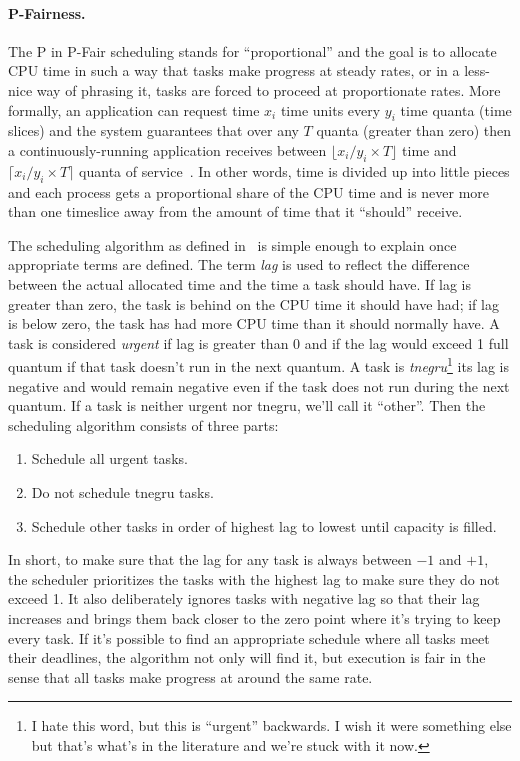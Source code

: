 \paragraph{P-Fairness.}
The P in P-Fair scheduling stands for ``proportional'' and the goal is to allocate CPU time in such a way that tasks make progress at steady rates, or in a less-nice way of phrasing it, tasks are forced to proceed at proportionate rates. More formally, an application can request time $x_i$ time units every $y_i$ time quanta (time slices) and the system guarantees that over any $T$ quanta (greater than zero) then a continuously-running application receives between $\lfloor x_i/y_i \times T\rfloor$ time and $\lceil x_i/y_i \times T\rceil$ quanta of service~\cite{pfair2}. In other words, time is divided up into little pieces and each process gets a proportional share of the CPU time and is never more than one timeslice away from the amount of time that it ``should'' receive.

The scheduling algorithm as defined in~\cite{pfair} is simple enough to explain once appropriate terms are defined. The term \textit{lag} is used to reflect the difference between the actual allocated time and the time a task should have. If lag is greater than zero, the task is behind on the CPU time it should have had; if lag is below zero, the task has had more CPU time than it should normally have.  A task is considered \textit{urgent} if lag is greater than 0 and if the lag would exceed 1 full quantum if that task doesn't run in the next quantum. A task is \textit{tnegru}\footnote{I hate this word, but this is ``urgent'' backwards. I wish it were something else but that's what's in the literature and we're stuck with it now.} its lag is negative and would remain negative even if the task does not run during the next quantum. If a task is neither urgent nor tnegru, we'll call it ``other''. Then the scheduling algorithm consists of three parts:
\begin{enumerate}
	\item Schedule all urgent tasks.
	\item Do not schedule tnegru tasks.
	\item Schedule other tasks in order of highest lag to lowest until capacity is filled.
\end{enumerate}

In short, to make sure that the lag for any task is always between $-1$ and $+1$, the scheduler prioritizes the tasks with the highest lag to make sure they do not exceed 1. It also deliberately ignores tasks with negative lag so that their lag increases and brings them back closer to the zero point where it's trying to keep every task. If it's possible to find an appropriate schedule where all tasks meet their deadlines, the algorithm not only will find it, but execution is fair in the sense that all tasks make progress at around the same rate.

